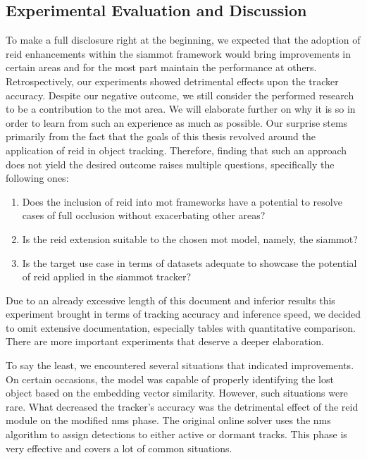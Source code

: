 \subsection{Experimental Evaluation and Discussion}

To make a full disclosure right at the beginning, we expected that the adoption of \gls{reid} enhancements within the \gls{siammot} framework would bring improvements in certain areas and for the most part maintain the performance at others. Retrospectively, our experiments showed detrimental effects upon the tracker accuracy. Despite our negative outcome, we still consider the performed research to be a contribution to the \gls{mot} area. We will elaborate further on why it is so in order to learn from such an experience as much as possible. Our surprise stems primarily from the fact that the goals of this thesis revolved around the application of \gls{reid} in object tracking. Therefore, finding that such an approach does not yield the desired outcome raises multiple questions, specifically the following ones:
\begin{enumerate}
    \item Does the inclusion of \gls{reid} into \gls{mot} frameworks have a potential to resolve cases of full occlusion without exacerbating other areas?
    \item Is the \gls{reid} extension suitable to the chosen \gls{mot} model, namely, the \gls{siammot}?
    \item Is the target use case in terms of datasets adequate to showcase the potential of \gls{reid} applied in the \gls{siammot} tracker?
\end{enumerate}

Due to an already excessive length of this document and inferior results this experiment brought in terms of tracking accuracy and inference speed, we decided to omit extensive documentation, especially tables with quantitative comparison. There are more important experiments that deserve a deeper elaboration.

To say the least, we encountered several situations that indicated improvements. On certain occasions, the model was capable of properly identifying the lost object based on the embedding vector similarity. However, such situations were rare. What decreased the tracker's accuracy was the detrimental effect of the \gls{reid} module on the modified \gls{nms} phase. The original online solver uses the \gls{nms} algorithm to assign detections to either active or dormant tracks. This phase is very effective and covers a lot of common situations.

